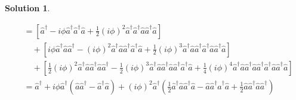 \documentclass[10pt]{article}
\theoremstyle{definition}
\newtheorem{soln}{Solution}
\begin{document}
\begin{soln}
\begin{enumerate}[label=(\alph*)]
\begin{align*}
                                                  & =
            \left[
              \hat{a}^\dagger
              -i\phi\hat{a}^\dagger\hat{a}^\dagger\hat{a}
              +\frac{1}{2}(i\phi)^2\hat{a}^\dagger\hat{a}^\dagger\hat{a}\hat{a}^\dagger\hat{a}
            \right]                                                                                                                                                                                                                                                                                                      \\
                                                  & \quad +
            \left[
              i\phi\hat{a}^\dagger\hat{a}\hat{a}^\dagger
              -(i\phi)^2\hat{a}^\dagger\hat{a}\hat{a}^\dagger\hat{a}^\dagger\hat{a}
              +\frac{1}{2}(i\phi)^3\hat{a}^\dagger\hat{a}\hat{a}^\dagger\hat{a}^\dagger\hat{a}\hat{a}^\dagger\hat{a}
            \right]                                                                                                                                                                                                                                                                                                      \\
                                                  & \quad +
            \left[
              \frac{1}{2}(i\phi)^2\hat{a}^\dagger\hat{a}\hat{a}^\dagger\hat{a}\hat{a}^\dagger
              -\frac{1}{2}(i\phi)^3\hat{a}^\dagger\hat{a}\hat{a}^\dagger\hat{a}\hat{a}^\dagger\hat{a}^\dagger\hat{a}
              +\frac{1}{4}(i\phi)^4\hat{a}^\dagger\hat{a}\hat{a}^\dagger\hat{a}\hat{a}^\dagger\hat{a}^\dagger\hat{a}\hat{a}^\dagger\hat{a}
            \right]                                                                                                                                                                                                                                                                                                      \\
                                                  & =
            \hat{a}^\dagger
            +i\phi\hat{a}^\dagger(\hat{a}\hat{a}^\dagger-\hat{a}^\dagger\hat{a})
            +(i\phi)^2\hat{a}^\dagger\left(\frac{1}{2}\hat{a}^\dagger\hat{a}\hat{a}^\dagger\hat{a}
            -\hat{a}\hat{a}^\dagger\hat{a}^\dagger\hat{a}
            +\frac{1}{2}\hat{a}\hat{a}^\dagger\hat{a}\hat{a}^\dagger
            \right)                                                                                                                                                                                                                                                                                                      \\

\end{align*}
\end{enumerate}
\end{soln}
\end{document}

